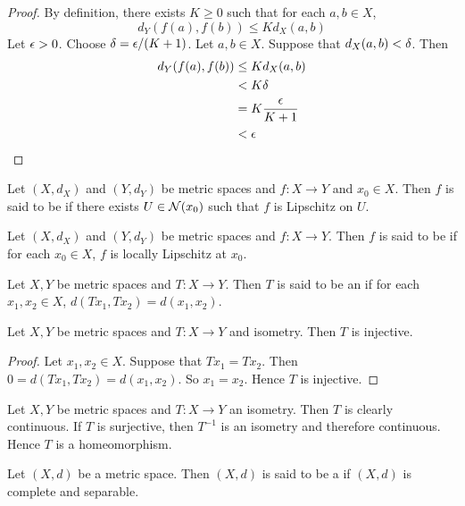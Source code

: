 \documentclass{book}
\begin{document}
\begin{proof}
	By definition, there exists $K \geq 0$ such that for each $a, b \in X$, $$d_Y(f(a), f(b)) \leq Kd_X(a,b)$$ Let $\epsilon >0$. Choose $\delta = \epsilon / (K+1)$. Let $a, b \in X$. Suppose that $d_X(a,b) < \delta$. Then 
	\begin{align*}
		d_Y(f(a), f(b)) 
		& \leq Kd_X(a,b) \\
		& < K \delta \\
		&= K \frac{\epsilon}{K+1} \\
		&< \epsilon  
	\end{align*}
\end{proof}

\begin{defn} \ld{}
	Let $(X, d_X)$ and $(Y, d_Y)$ be metric spaces and $f: X \rightarrow Y$ and $x_0 \in X$. Then $f$ is said to be  if there exists $U \in \mathcal{N}(x_0)$ such that $f$ is Lipschitz on $U$.
\end{defn}

\begin{defn} \ld{}
	Let $(X, d_X)$ and $(Y, d_Y)$ be metric spaces and $f: X \rightarrow Y$. Then $f$ is said to be  if for each $x_0 \in X$, $f$ is locally Lipschitz at $x_0$.
\end{defn}


\begin{defn} \ld{}
	Let $X, Y$ be metric spaces and $T : X \rightarrow Y$. Then $T$ is said to be an  if for each $x_1, x_2 \in X$, $d( Tx_1, Tx_2) = d(x_1,x_2) $.
\end{defn}

\begin{ex} \lex{}
	Let $X,Y$ be metric spaces and $T:X \rightarrow Y$ and isometry. Then $T$ is injective.
\end{ex}

\begin{proof}
	Let $x_1, x_2 \in X$. Suppose that $Tx_1=Tx_2$. Then $0= d( Tx_1, Tx_2) = d(x_1,x_2)$. So $x_1 = x_2$. Hence $T$ is injective.
\end{proof}

\begin{note}
	Let $X,Y$ be metric spaces and $T:X \rightarrow Y$ an isometry. Then $T$ is clearly continuous. If $T$ is surjective, then $T^{-1}$ is an isometry and therefore continuous. Hence $T$ is a homeomorphism.
\end{note}

\begin{defn} \ld{}
	Let $(X,d)$ be a metric space. Then $(X,d)$ is said to be a  if $(X,d)$ is complete and separable. 
\end{defn}
\end{document}
